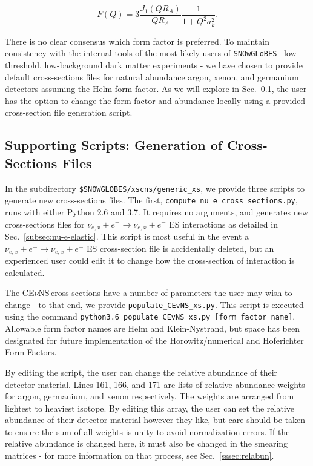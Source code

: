 \documentclass{article}
\newcommand{\cev}{CE$\nu$NS\,}
\newcommand{\snow}{\texttt{SNOwGLoBES}\,}
\begin{document}
\begin{equation}
    F(Q) = 3 \frac{J_1(Q R_A)}{Q R_A} \frac{1}{1+Q^2 a_k^2}.
    \label{eqn:knform}
\end{equation}

\noindent There is no clear consensus which form factor is preferred. To maintain consistency with the internal tools of the most likely users of \snow - low-threshold, low-background dark matter experiments - we have chosen to provide default cross-sections files for natural abundance argon, xenon, and germanium detectors assuming the Helm form factor. As we will explore in Sec.~\ref{subsec:xsecsupportscripts}, the user has the option to change the form factor and abundance locally using a provided cross-section file generation script.

\subsection{Supporting Scripts: Generation of Cross-Sections Files} \label{subsec:xsecsupportscripts}

In the subdirectory \texttt{\$SNOWGLOBES/xscns/generic\_xs}, we provide three scripts to generate new cross-sections files. The first, \texttt{compute\_nu\_e\_cross\_sections.py}, runs with either Python 2.6 and 3.7. It requires no arguments, and generates new cross-sections files for $\nu_{e,x} + e^- \rightarrow \nu_{e,x} + e^-$ ES interactions as detailed in Sec.~\ref{subsec:nu-e-elastic}. This script is most useful in the event a $\nu_{e,x} + e^- \rightarrow \nu_{e,x} + e^-$ ES cross-section file is accidentally deleted, but an experienced user could edit it to change how the cross-section of interaction is calculated.

The \cev cross-sections have a number of parameters the user may wish to change - to that end, we provide \texttt{populate\_CEvNS\_xs.py}. This script is executed using the command \texttt{python3.6 populate\_CEvNS\_xs.py [form factor name]}. Allowable form factor names are Helm and Klein-Nystrand, but space has been designated for future implementation of the Horowitz/numerical and Hoferichter Form Factors. 

By editing the script, the user can change the relative abundance of their detector material. Lines 161, 166, and 171 are lists of relative abundance weights for argon, germanium, and xenon respectively. The weights are arranged from lightest to heaviest isotope. By editing this array, the user can set the relative abundance of their detector material however they like, but care should be taken to ensure the sum of all weights is unity to avoid normalization errors. If the relative abundance is changed here, it must also be changed in the smearing matrices - for more information on that process, see Sec.~\ref{sssec:relabun}.
\end{document}
